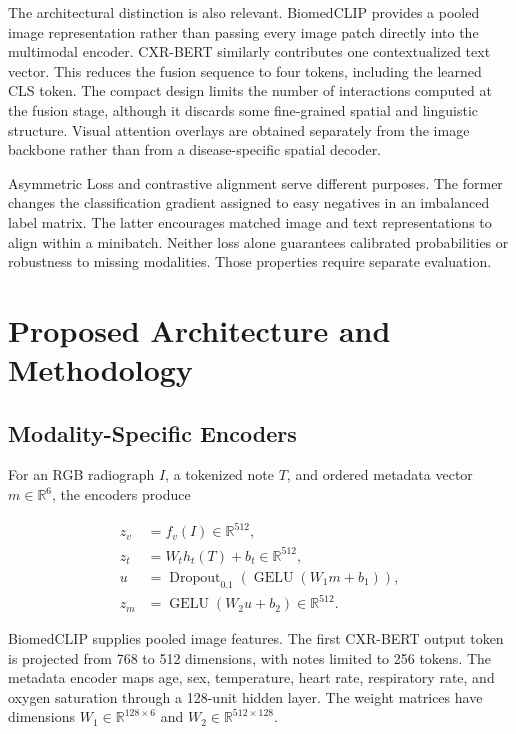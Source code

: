 \documentclass[conference,letterpaper]{IEEEtran}
\begin{document}
The architectural distinction is also relevant. BiomedCLIP provides a pooled image representation rather than passing every image patch directly into the multimodal encoder. CXR-BERT similarly contributes one contextualized text vector. This reduces the fusion sequence to four tokens, including the learned CLS token. The compact design limits the number of interactions computed at the fusion stage, although it discards some fine-grained spatial and linguistic structure. Visual attention overlays are obtained separately from the image backbone rather than from a disease-specific spatial decoder.

Asymmetric Loss and contrastive alignment serve different purposes. The former changes the classification gradient assigned to easy negatives in an imbalanced label matrix. The latter encourages matched image and text representations to align within a minibatch. Neither loss alone guarantees calibrated probabilities or robustness to missing modalities. Those properties require separate evaluation.

\section{Proposed Architecture and Methodology}

\subsection{Modality-Specific Encoders}

For an RGB radiograph $I$, a tokenized note $T$, and ordered metadata vector $m\in\mathbb{R}^{6}$, the encoders produce

\begin{align}
z_v &= f_v(I)\in\mathbb{R}^{512},
\label{eq:vision}\\
z_t &= W_t h_t(T)+b_t\in\mathbb{R}^{512},
\label{eq:text}\\
u &= \operatorname{Dropout}_{0.1}
(\operatorname{GELU}(W_1m+b_1)),
\label{eq:meta1}\\
z_m &= \operatorname{GELU}(W_2u+b_2)
\in\mathbb{R}^{512}.
\label{eq:meta2}
\end{align}

BiomedCLIP supplies pooled image features. The first CXR-BERT output token is projected from 768 to 512 dimensions, with notes limited to 256 tokens. The metadata encoder maps age, sex, temperature, heart rate, respiratory rate, and oxygen saturation through a 128-unit hidden layer. The weight matrices have dimensions $W_1\in\mathbb{R}^{128\times6}$ and $W_2\in\mathbb{R}^{512\times128}$.
\end{document}
